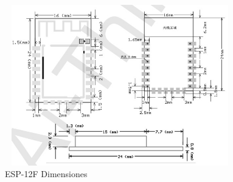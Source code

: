     \begin{figure}[H]
        \centering
        \includegraphics[width=10cm, height=7cm]{imagenes/esp-12F dimensiones.jpg}
        \caption{ESP-12F Dimensiones}
        \label{imag:esp-12F_dimensiones}
    \end{figure}

    \vspace{4cm}


    
    


